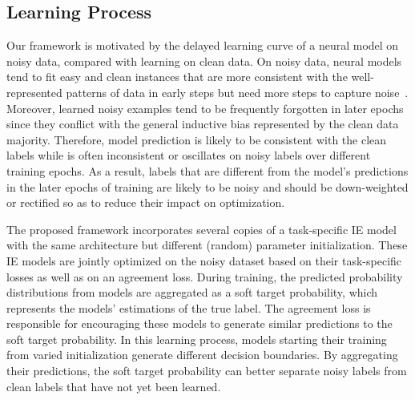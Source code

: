 \documentclass[11pt]{article}
\begin{document}
\subsection{Learning Process}\label{sec:process}
Our framework is motivated by the delayed learning curve of a neural model on noisy data, compared with learning on clean data.
On noisy data, neural models tend to fit easy and clean instances that are more consistent with the well-represented patterns of data in early steps but need more steps to capture noise~\cite{Arpit2017ACL}.
Moreover, learned noisy examples tend to be frequently forgotten in later epochs~\cite{Toneva2019AnES} since they conflict with the general inductive bias represented by the clean data majority.
Therefore, model prediction is likely to be consistent with the clean labels while is often inconsistent or oscillates on noisy labels over different training epochs.
As a result, labels that are different from the model's predictions in the later epochs of training are likely to be noisy and should be down-weighted or rectified so as to reduce their impact on optimization.

The proposed framework incorporates several copies of a task-specific IE model with the same architecture but different (random) parameter initialization.
These IE models are jointly optimized on the noisy dataset based on their task-specific losses as well as on an agreement loss.
During training, the predicted probability distributions from models are aggregated as a soft target probability, which represents the models' estimations of the true label.
The agreement loss is responsible for encouraging these models to generate similar predictions to the soft target probability.
In this learning process,
models starting their training from varied initialization  generate different decision boundaries.
By aggregating their predictions, the soft target probability can better separate noisy labels from clean labels that have not yet been learned.
\end{document}
